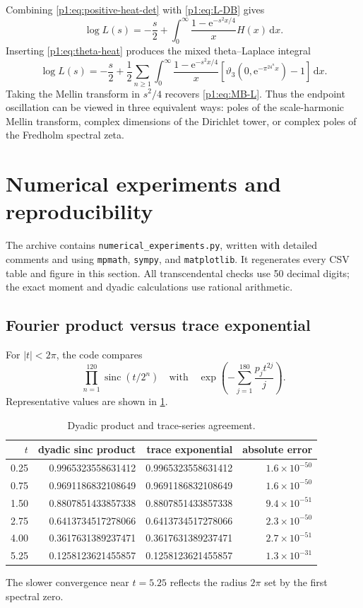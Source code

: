 \documentclass[11pt,oneside]{article}
\theoremstyle{definition}
\newcommand{\dd}{\,\mathrm d}
\newcommand{\e}{\mathrm e}
\newcommand{\sinc}{\operatorname{sinc}}
\begin{document}
Combining \eqref{p1:eq:positive-heat-det} with \eqref{p1:eq:L-DB} gives
\begin{equation}
 \log L(s)=-\frac s2+
 \int_0^\infty\frac{1-\e^{-s^2x/4}}xH(x)\dd x.
 \label{p1:eq:L-heat}
\end{equation}
Inserting \eqref{p1:eq:theta-heat} produces the mixed theta--Laplace integral
\begin{equation}
 \log L(s)=-\frac s2+\frac12\sum_{n\ge1}\int_0^\infty
 \frac{1-\e^{-s^2x/4}}x
 \left[\vartheta_3(0,\e^{-\pi^24^nx})-1\right]\dd x.
 \label{p1:eq:L-theta-integral}
\end{equation}
Taking the Mellin transform in \(s^2/4\) recovers \eqref{p1:eq:MB-L}.  Thus the endpoint
oscillation can be viewed in three equivalent ways: poles of the scale-harmonic Mellin
transform, complex dimensions of the Dirichlet tower, or complex poles of the
Fredholm spectral zeta.

\section{Numerical experiments and reproducibility}
\label{p1:sec:numerics}

The archive contains \texttt{numerical\_experiments.py}, written with detailed
comments and using \texttt{mpmath}, \texttt{sympy}, and \texttt{matplotlib}.  It
regenerates every CSV table and figure in this section.  All transcendental checks use
50 decimal digits; the exact moment and dyadic calculations use rational arithmetic.

\subsection{Fourier product versus trace exponential}

For \(|t|<2\pi\), the code compares
\[
 \prod_{n=1}^{120}\sinc(t/2^n)
 \quad\text{with}\quad
 \exp\!\left(-\sum_{j=1}^{180}\frac{p_jt^{2j}}j\right).
\]
Representative values are shown in \cref{p1:tab:product-check}.

\begin{table}[H]
\centering
\caption{Dyadic product and trace-series agreement.}
\label{p1:tab:product-check}
\begin{tabular}{rrrr}
\toprule
\(t\)&dyadic sinc product&trace exponential&absolute error\\
\midrule
0.25&0.9965323558631412&0.9965323558631412&\(1.6\times10^{-50}\)\\
0.75&0.9691186832108649&0.9691186832108649&\(1.6\times10^{-50}\)\\
1.50&0.8807851433857338&0.8807851433857338&\(9.4\times10^{-51}\)\\
2.75&0.6413734517278066&0.6413734517278066&\(2.3\times10^{-50}\)\\
4.00&0.3617631389237471&0.3617631389237471&\(2.7\times10^{-51}\)\\
5.25&0.1258123621455857&0.1258123621455857&\(1.3\times10^{-31}\)\\
\bottomrule
\end{tabular}
\end{table}
The slower convergence near \(t=5.25\) reflects the radius \(2\pi\) set by the first
spectral zero.
\end{document}
